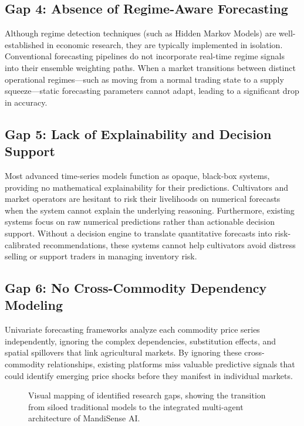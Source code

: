 \documentclass[12pt,a4paper]{report}
\theoremstyle{definition}
\theoremstyle{remark}
\begin{document}
\subsection{Gap 4: Absence of Regime-Aware Forecasting}
Although regime detection techniques (such as Hidden Markov Models) are well-established in economic research, they are typically implemented in isolation. Conventional forecasting pipelines do not incorporate real-time regime signals into their ensemble weighting paths. When a market transitions between distinct operational regimes—such as moving from a normal trading state to a supply squeeze—static forecasting parameters cannot adapt, leading to a significant drop in accuracy.

\subsection{Gap 5: Lack of Explainability and Decision Support}
Most advanced time-series models function as opaque, black-box systems, providing no mathematical explainability for their predictions. Cultivators and market operators are hesitant to risk their livelihoods on numerical forecasts when the system cannot explain the underlying reasoning. Furthermore, existing systems focus on raw numerical predictions rather than actionable decision support. Without a decision engine to translate quantitative forecasts into risk-calibrated recommendations, these systems cannot help cultivators avoid distress selling or support traders in managing inventory risk.

\subsection{Gap 6: No Cross-Commodity Dependency Modeling}
Univariate forecasting frameworks analyze each commodity price series independently, ignoring the complex dependencies, substitution effects, and spatial spillovers that link agricultural markets. By ignoring these cross-commodity relationships, existing platforms miss valuable predictive signals that could identify emerging price shocks before they manifest in individual markets.

\begin{figure}[htbp]
    \centering
    \caption{Visual mapping of identified research gaps, showing the transition from siloed traditional models to the integrated multi-agent architecture of MandiSense AI.}
    \label{fig:research_gap_vis}
\end{figure}
\end{document}
